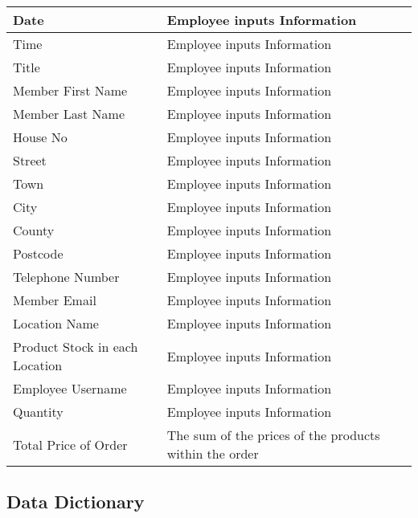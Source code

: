 \begin{tabular}{|p{4cm}|p{4cm}|}
	{Date} & {Employee inputs Information}\\ \hline
	{Time} & {Employee inputs Information}\\ \hline
	{Title} & {Employee inputs Information}\\ \hline
	{Member First Name} & {Employee inputs Information}\\ \hline
	{Member Last Name} & {Employee inputs Information}\\ \hline
	{House No} & {Employee inputs Information}\\ \hline
	{Street} & {Employee inputs Information}\\ \hline
	{Town} & {Employee inputs Information}\\ \hline
	{City} & {Employee inputs Information}\\ \hline
	{County} & {Employee inputs Information}\\ \hline
	{Postcode} & {Employee inputs Information}\\ \hline
	{Telephone Number} & {Employee inputs Information}\\ \hline
	{Member Email} & {Employee inputs Information}\\ \hline
	{Location Name} & {Employee inputs Information}\\ \hline
	{Product Stock in each Location} & {Employee inputs Information}\\ \hline
	{Employee Username} & {Employee inputs Information}\\ \hline
	{Quantity} & {Employee inputs Information}\\ \hline
	{Total Price of Order} & {The sum of the prices of the products within the order}
   \end{tabular}


\subsection{Data Dictionary}

